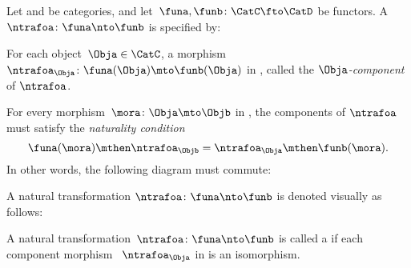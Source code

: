 \begin{ctdefinition}
    \label{def:natural-transformation}
    Let \CatC and \CatD be categories, and let~$\funa,\funb\colon \CatC\fto \CatD$ be functors.
    A \emph{}~$\ntrafoa \colon \funa\nto \funb$ is specified by:

    \constit
    \begin{compactenum}
        \item For each object~$\Obja\in \CatC$, a morphism $\ntrafoa_\Obja \colon \funa(\Obja)\mto \funb(\Obja)$ in \CatD, called the $\Obja$\emph{-component} of $\ntrafoa$.
    \end{compactenum}
    \condit
    \begin{compactenum}
        \item For every morphism~$\mora\colon \Obja\mto \Objb$ in \CatC, the components of $\ntrafoa$ must satisfy the \emph{naturality condition}
              \begin{equation}
                  \funa(\mora)\mthen \ntrafoa_\Objb = \ntrafoa_\Obja\mthen \funb(\mora).
              \end{equation}
              In other words, the following diagram must commute:
              \begin{center}
              \end{center}
    \end{compactenum}
    A natural transformation $\ntrafoa \colon \funa\nto \funb$ is denoted visually as follows:
    \begin{center}
    \end{center}
\end{ctdefinition}

\begin{figure}[h!]
    \centering
    \caption{}
    \label{fig:nat_trans_graphically}
\end{figure}

\begin{ctdefinition}
    \label{def:nat_iso}
    A natural transformation~$\ntrafoa \colon \funa \nto \funb $ is called a \emph{} if each component morphism ~$\ntrafoa_\Obja$ in \CatD is an isomorphism.
\end{ctdefinition}


